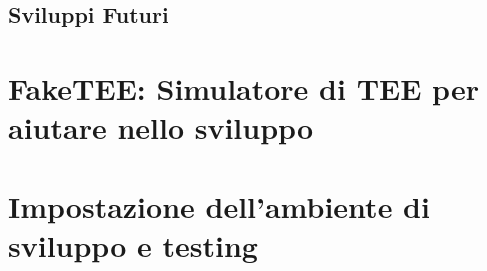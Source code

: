 \documentclass[12pt,italian]{report}
\begin{document}
\section{Sviluppi Futuri}
\label{sec:sviluppi-futuri}

\appendix
\chapter{FakeTEE: Simulatore di TEE per aiutare nello sviluppo}
\label{chap:faketee}

\chapter{Impostazione dell'ambiente di sviluppo e testing}
\label{chap:impostazione-ambiente-sviluppo-testing}



\end{document}
